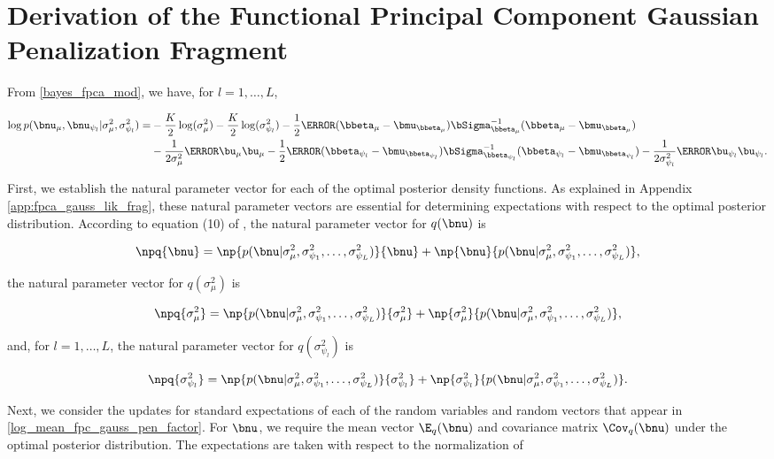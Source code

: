 \documentclass[12pt]{article}
\def\sigsqmu{\sigma^2_{\mu}}
\def\betamu{\bbeta_\mu}
\def\umu{\bu_\mu}
\def\numu{\bnu_\mu}
\newcommand\betapsi[1]{\bbeta_{\psi_{#1}}}
\newcommand\upsi[1]{\bu_{\psi_{#1}}}
\newcommand\nupsi[1]{\bnu_{\psi_{#1}}}
\newcommand\sigsqpsi[1]{\sigma^2_{\psi_{#1}}}
\theoremstyle{plain}
\theoremstyle{definition}
\theoremstyle{remark}
\begin{document}
\section{Derivation of the Functional Principal Component Gaussian Penalization Fragment}
\label{app:mean_fpc_gauss_pen_frag}

From \eqref{bayes_fpca_mod}, we have, for $l = 1, \dots, L$,

\begin{align}
\begin{split}
	\log p (\numu, \nupsi{l} | \sigsqmu, \sigsqpsi{l}) =
		& -\frac{K}{2} \log (\sigsqmu) - \frac{K}{2} \log (\sigsqpsi{l})
			- \frac12 \T{(\betamu - \bmu_{\betamu})} \bSigma_{\betamu}^{-1} (\betamu - \bmu_{\betamu}) \\
		& - \frac{1}{2 \sigsqmu} \T{\umu} \umu
			- \frac12 \T{(\betapsi{l} - \bmu_{\betapsi{l}})} \bSigma_{\betapsi{l}}^{-1} (\betapsi{l} - \bmu_{\betapsi{l}})
			- \frac{1}{2 \sigsqpsi{l}} \T{\upsi{l}} \upsi{l}.
\end{split}
\label{log_mean_fpc_gauss_pen_factor}
\end{align}

First, we establish the natural parameter vector for each of the optimal posterior density functions. As explained
in Appendix \ref{app:fpca_gauss_lik_frag}, these natural
parameter vectors are essential for determining expectations with respect to the optimal posterior distribution.
According to equation (10) of , the natural parameter vector for $q (\bnu)$ is

\[
	\npq{\bnu} =
		\np{p(\bnu | \sigsqmu, \sigsqpsi{1}, \dots, \sigsqpsi{L})}{\bnu}
		+ \np{\bnu}{p(\bnu | \sigsqmu, \sigsqpsi{1}, \dots, \sigsqpsi{L})},
\]

\noindent the natural parameter vector for $q (\sigsqmu)$ is

\[
	\npq{\sigsqmu} =
		\np{p(\bnu | \sigsqmu, \sigsqpsi{1}, \dots, \sigsqpsi{L})}{\sigsqmu}
		+ \np{\sigsqmu}{p(\bnu | \sigsqmu, \sigsqpsi{1}, \dots, \sigsqpsi{L})},
\]

\noindent and, for $l = 1, \dots, L$, the natural parameter vector for $q(\sigsqpsi{l})$ is

\[
	\npq{\sigsqpsi{l}} =
		\np{p(\bnu | \sigsqmu, \sigsqpsi{1}, \dots, \sigsqpsi{L})}{\sigsqpsi{l}}
		+ \np{\sigsqpsi{l}}{p(\bnu | \sigsqmu, \sigsqpsi{1}, \dots, \sigsqpsi{L})}.
\]

Next, we consider the updates for standard expectations of each of the random variables and random vectors
that appear in \eqref{log_mean_fpc_gauss_pen_factor}. For $\bnu$, we require the mean vector $\E_q (\bnu)$
and covariance matrix $\Cov_q (\bnu)$ under the optimal posterior distribution. The expectations are taken with
respect to the normalization of
\end{document}
